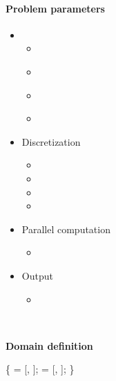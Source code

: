 \begin{frame}[fragile] 
\secframetitle{\ssParameters}
\framesubtitle{Problem parameters}
\vspace{-0.2in}
\begin{minipage}[t]{1.7in}
\begin{itemize}
\item {}
  \begin{itemize}
  \item {}
  \item \textcolor{blue}{}
  \item \textcolor{blue}{}
  \item \textcolor{blue}{}
  \end{itemize}
\item Discretization
  \begin{itemize}
  \item {}
  \item {}
  \item {}
  \item {}
  \end{itemize}
\item Parallel computation
  \begin{itemize}
  \item {}
  \end{itemize}
\item Output
  \begin{itemize}
    \item {}
  \end{itemize}
\end{itemize}
\end{minipage} \
\begin{minipage}[t]{2.6in}
\vspace{-0.2in}
\begin{block}{\textbf{Domain definition}}
\footnotesize \vspace{-0.1in}
\begin{semiverbatim}
 \{
    = [, ];
    = [, \valuetext{0.3}];
\} 
\end{semiverbatim}
\end{block}
\end{minipage}
\end{frame}



